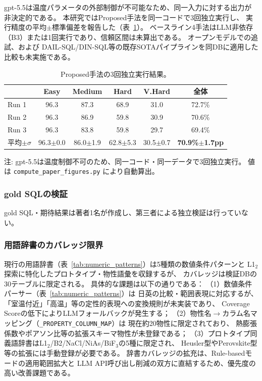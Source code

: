 \documentclass[5p,twocolumn]{elsarticle}
\begin{document}
gpt-5.5は温度パラメータの外部制御が不可能なため、同一入力に対する出力が非決定的である。
本研究ではProposed手法を同一コードで3回独立実行し、
実行精度の平均$\pm$標準偏差を報告した（表~\ref{tab:3run_stats}）。
ベースライン4手法はLLM非依存（B3）または1回実行であり、信頼区間は未算出である。
オープンモデルでの追試、および
DAIL-SQL/DIN-SQL等の既存SOTAパイプラインを同DBに適用した比較も未実施である。

\begin{table}[tbp]
  \centering
  \caption{Proposed手法の3回独立実行結果。}
  \label{tab:3run_stats}
  \footnotesize
  \begin{tabular}{lccccc}
    \hline
    & Easy & Medium & Hard & V.Hard & \textbf{全体} \\
    \hline
    Run 1 & 96.3 & 87.3 & 68.9 & 31.0 & 72.7\% \\
    Run 2 & 96.3 & 86.9 & 59.8 & 30.9 & 70.6\% \\
    Run 3 & 96.3 & 83.8 & 59.8 & 29.7 & 69.4\% \\
    \hline
    平均$\pm\sigma$ & 96.3$\pm$0.0 & 86.0$\pm$1.9 & 62.8$\pm$5.3 & 30.5$\pm$0.7 & \textbf{70.9\%$\pm$1.7pp} \\
    \hline
  \end{tabular}
  \begin{flushleft}
  \footnotesize 注: gpt-5.5は温度制御不可のため、同一コード・同一データで3回独立実行。
  値は \texttt{compute\_paper\_figures.py} により自動算出。
  \end{flushleft}
\end{table}

\subsubsection{gold SQLの検証}

gold SQL・期待結果は著者1名が作成し、第三者による独立検証は行っていない。

\subsubsection{用語辞書のカバレッジ限界}

現行の用語辞書（表~\ref{tab:numeric_patterns}）は5種類の数値条件パターンと
L1$_2$探索に特化したプロトタイプ・物性語彙を収録するが、
カバレッジは検証DBの30テーブルに限定される。
具体的な課題は以下の通りである：
（1）数値条件パーサー（表~\ref{tab:numeric_patterns}）は
日英の比較・範囲表現に対応するが、
「室温付近」「高温」等の定性的表現への変換規則が未実装であり、
Coverage Scoreの低下によりLLMフォールバックが発生する；
（2）物性名$\to$カラム名マッピング（\texttt{\_PROPERTY\_COLUMN\_MAP}）は
現在約20物性に限定されており、
熱膨張係数やポアソン比等の拡張スキーマ物性が未登録である；
（3）プロトタイプ同義語辞書はL1$_2$/B2/NaCl/NiAs/BiF$_3$の5種に限定され、
Heusler型やPerovskite型等の拡張には手動登録が必要である。
辞書カバレッジの拡充は、Rule-basedモードの適用範囲拡大と
LLM API呼び出し削減の双方に直結するため、優先度の高い改善課題である。
\end{document}
